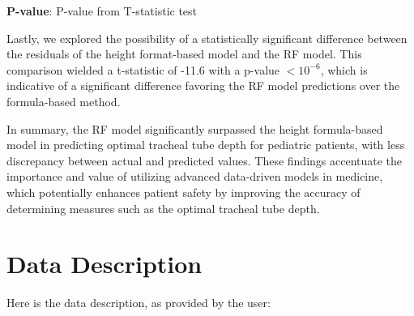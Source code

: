 \documentclass[11pt]{article}
\begin{document}
\begin{table}[h]
\caption{Comparison between the Height Formula and Random Forest Model}
\label{table:comparison}
\begin{threeparttable}
\renewcommand{\TPTminimum}{\linewidth}
\begin{tablenotes}
\footnotesize
\item \textbf{P-value}: P-value from T-statistic test
\end{tablenotes}
\end{threeparttable}
\end{table}


Lastly, we explored the possibility of a statistically significant difference between the residuals of the height format-based model and the RF model. This comparison wielded a t-statistic of -11.6 with a p-value $<$$10^{-6}$, which is indicative of a significant difference favoring the RF model predictions over the formula-based method. 

In summary, the RF model significantly surpassed the height formula-based model in predicting optimal tracheal tube depth for pediatric patients, with less discrepancy between actual and predicted values. These findings accentuate the importance and value of utilizing advanced data-driven models in medicine, which potentially enhances patient safety by improving the accuracy of determining measures such as the optimal tracheal tube depth.


\clearpage
\appendix

\section{Data Description} \label{sec:data_description} Here is the data description, as provided by the user:
\end{document}
